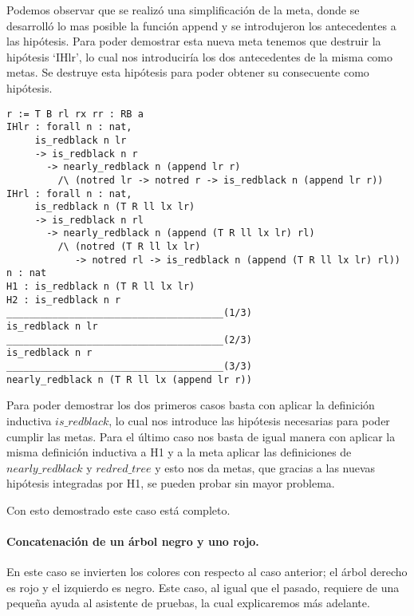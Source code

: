Podemos observar que se realiz\'o una simplificaci\'on de la meta, donde se desarroll\'o lo mas
posible la funci\'on append y se introdujeron los antecedentes a las hip\'otesis. Para poder
demostrar esta nueva meta tenemos que destruir la hipótesis `IHlr', lo cual nos introduciría los
dos antecedentes de la misma como metas. Se destruye esta hipótesis para poder obtener su 
consecuente como hip\'otesis.

\begin{verbatim}
r := T B rl rx rr : RB a
IHlr : forall n : nat,
     is_redblack n lr
     -> is_redblack n r
       -> nearly_redblack n (append lr r)
         /\ (notred lr -> notred r -> is_redblack n (append lr r))
IHrl : forall n : nat,
     is_redblack n (T R ll lx lr)
     -> is_redblack n rl
       -> nearly_redblack n (append (T R ll lx lr) rl)
         /\ (notred (T R ll lx lr)
            -> notred rl -> is_redblack n (append (T R ll lx lr) rl))
n : nat
H1 : is_redblack n (T R ll lx lr)
H2 : is_redblack n r
______________________________________(1/3)
is_redblack n lr
______________________________________(2/3)
is_redblack n r
______________________________________(3/3)
nearly_redblack n (T R ll lx (append lr r))
\end{verbatim}

Para poder demostrar los dos primeros casos basta con aplicar la definici\'on inductiva
\hyperref[inductive_isRedB]{$is\_redblack$}, lo cual nos introduce las hipótesis necesarias para 
poder cumplir las metas.
Para el \'ultimo caso nos basta de igual manera con aplicar la misma definici\'on inductiva a H1 y
a la meta aplicar las definiciones de \hyperref[inductive_isRedB]{$nearly\_redblack$} y 
\hyperref[inductive_isRedB]{$redred\_tree$} y esto nos da metas, que gracias a las nuevas 
hip\'otesis integradas por H1, se pueden probar sin mayor problema.

Con esto demostrado este caso est\'a completo.

\paragraph{Concatenaci\'on de un \'arbol negro y uno rojo.}

En este caso se invierten los colores con respecto al caso anterior; el \'arbol derecho es rojo y
el izquierdo es negro. Este caso, al igual que el pasado, requiere de una pequeña ayuda al
asistente de pruebas, la cual explicaremos m\'as adelante.

